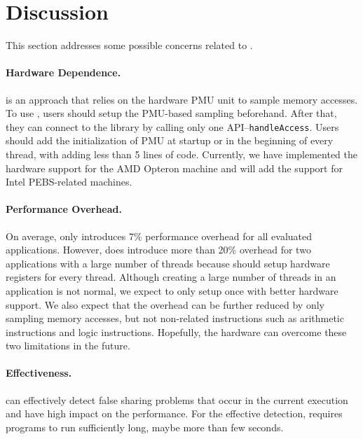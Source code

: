 \section{Discussion}

\label{sec:discuss}

This section addresses some possible concerns related to \Cheetah{}. 

\paragraph{Hardware Dependence.} \cheetah{} is an approach that relies on the hardware PMU unit to sample memory accesses. To use \cheetah{}, users should setup the PMU-based sampling beforehand. After that, they can connect to the \cheetah{} library by calling only one API--\texttt{handleAccess}. Users should add the initialization of PMU at startup or in the beginning of every thread, with adding less than 5 lines of code. Currently, we have implemented the hardware support for the AMD Opteron machine and will add the support for Intel PEBS-related machines. 

\paragraph{Performance Overhead.} On average, \Cheetah{} only introduces 7\% performance overhead for all evaluated applications. However, \cheetah{} does introduce more than 20\% overhead for two applications with a large number of threads because \cheetah{} should setup hardware registers for every thread. Although creating a large number of threads in an application is not normal, we expect to only setup once with better hardware support. We also expect that the overhead can be further reduced by only sampling memory accesses, but not non-related instructions such as arithmetic instructions and logic instructions. Hopefully, the hardware can overcome these two limitations in the future.

\paragraph{Effectiveness.} \Cheetah{} can effectively detect false sharing problems that occur in the current execution and have high impact on the performance. For the effective detection, \Cheetah{} requires programs to run sufficiently long, maybe more than few seconds. 
